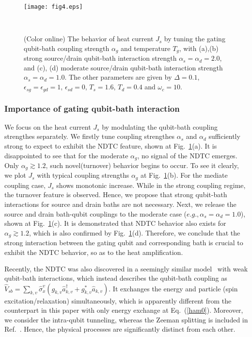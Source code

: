 \documentclass[twocolumn,preprintnumbers,amsmath,amssymb]{revtex4}
\begin{document}
\begin{figure}[tbp]
\texttt{[image: fig4.eps]}
\caption{(Color online) The behavior of heat current $J_s$ by tuning the gating qubit-bath coupling strength $\alpha_g$ and temperature $T_g$,
with (a),(b) strong source/drain qubit-bath interaction strength $\alpha_s=\alpha_d=2.0$,
and (c), (d) moderate source/drain qubit-bath interaction strength $\alpha_s=\alpha_d=1.0$.
The other parameters are given by $\Delta=0.1$, $\epsilon_{sg}=\epsilon_{gd}=1$, $\epsilon_{sd}=0$, $T_s=1.6$, $T_d=0.4$ and $\omega_c=10$.
}~\label{fig4}
\end{figure}

\subsubsection{Importance of gating qubit-bath interaction}

We focus on the heat current $J_s$  by modulating the qubit-bath coupling strengthes separately.
We firstly tune coupling strengthes $\alpha_s$ and $\alpha_d$ sufficiently strong to expect to exhibit the NDTC feature, shown at Fig.~\ref{fig4}(a).
It is disappointed to see that for the moderate $\alpha_g$, no signal of the NDTC emerges. Only $\alpha_g{\gtrsim}1.2$, such novel(turnover) behavior begins to occur.
To see it clearly, we plot $J_s$ with typical coupling strengths $\alpha_g$ at Fig.~\ref{fig4}(b). For  the mediate coupling case, $J_s$ shows monotonic increase.
While in the strong coupling regime, the turnover feature is observed.
Hence, we propose that strong qubit-bath interactions for source and drain baths are not necessary.
Next, we release the source and drain bath-qubit couplings to the moderate case ($e.g., \alpha_s=\alpha_d=1.0$), shown at Fig.~\ref{fig4}(c).
It is demonstrated that NDTC behavior also exists for $\alpha_g{\gtrsim}1.2$, which is also confirmed by Fig.~\ref{fig4}(d).
Therefore, we conclude that the strong interaction between the gating qubit and corresponding bath is crucial to exhibit the NDTC behavior, so as to the heat amplification.


Recently, the NDTC was also discovered in a seemingly similar model~\cite{kjoulain2016prl} with weak qubit-bath interactions,
which instead describes the qubit-bath coupling as $\hat{V}_{sb}=\sum_{k,v}\hat{\sigma}^v_{x}(g_{k,v}\hat{a}^{\dag}_{k,v}+g^{*}_{k,v}\hat{a}_{k,v})$.
It exchanges the energy and particle (spin excitation/relaxation) simultaneously,
which is apparently different from the counterpart in this paper with only energy exchange at Eq.~(\ref{ham0}).
Moreover, we consider the intra-qubit tunneling, whereas the Zeeman splitting is included in Ref.~\cite{kjoulain2016prl}.
Hence, the physical processes are significantly distinct from each other.
\end{document}
